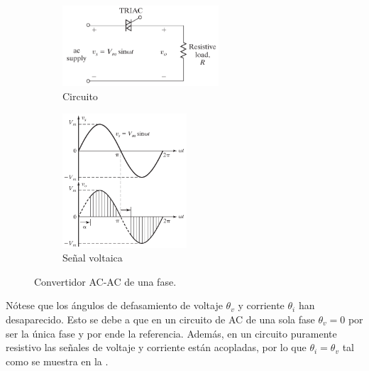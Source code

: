 \begin{figure}[H]
	\centering
	\begin{subfigure}[b]{0.5\columnwidth}
		\centering
		\includegraphics[width=\textwidth,height=3cm,keepaspectratio]{img/ac-ac-conv-dia.png}
		\caption{Circuito}%
		\label{fig:ac-ac-conv-dia} %
	\end{subfigure}%
	\begin{subfigure}[b]{0.5\columnwidth}
		\centering
		\includegraphics[width=\textwidth,height=5cm,keepaspectratio]{img/ac-ac-conv-wave.png}
		\caption{Señal voltaica}%
		\label{fig:ac-ac-conv-wave} %
	\end{subfigure}
	\caption[Convertidor AC-AC]{Convertidor AC-AC de una fase.\footnotemark{}}%
	\label{fig:ac-ac-conv} %
\end{figure}

Nótese que los ángulos de defasamiento de voltaje $\theta_v$ y corriente $\theta_i$ han desaparecido.
Esto se debe a que en un circuito de AC de una sola fase $\theta_v = 0$ por ser la única fase y por ende la referencia.
Además, en un circuito puramente resistivo las señales de voltaje y corriente están acopladas, por lo que $\theta_i = \theta_v$ tal como se muestra en la .

